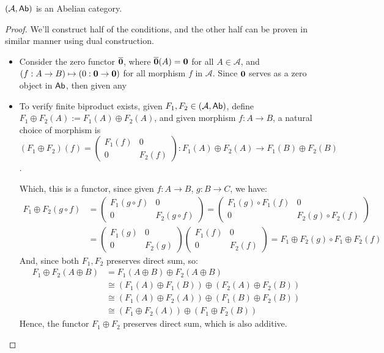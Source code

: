 \documentclass{article}
\begin{document}
\begin{thm}
    $(\mathcal{A},\mathsf{Ab})$ is an Abelian category.
\end{thm}
\begin{proof}

    We'll construct half of the conditions, and the other half can be proven in similar manner using dual construction.

    \begin{itemize}
        \item[A0:] Consider the zero functor $\overline{\mathbf{0}}$, where $\overline{\mathbf{0}}(A)=\mathbf{0}$ for all $A\in\mathcal{A}$, and $(f:A\rightarrow B)\mapsto (0:\mathbf{0}\rightarrow\mathbf{0})$ for all morphism $f$ in $\mathcal{A}$. Since $\mathbf{0}$ serves as a zero object in $\mathsf{Ab}$, then given any 
        
        \hfil

        \item[A1:] To verify finite biproduct exists, given $F_1,F_2\in(\mathcal{A},\mathsf{Ab})$, define $F_1\oplus F_2(A):= F_1(A)\oplus F_2(A)$, and given morphism $f:A\rightarrow B$, a natural choice of morphism is $(F_1\oplus F_2)(f) = \begin{pmatrix}
            F_1(f) & 0\\0& F_2 (f)
        \end{pmatrix}:F_1(A)\oplus F_2(A) \rightarrow F_1(B)\oplus F_2(B)$.

        Which, this is a functor, since given $f:A\rightarrow B$, $g:B\rightarrow C$, we have:
        \begin{align}
            F_1\oplus F_2(g\circ f) &= \begin{pmatrix}
                F_1(g\circ f)&0\\0&F_2(g\circ f)
            \end{pmatrix} = \begin{pmatrix}
                F_1(g)\circ F_1(f)&0\\0&F_2(g)\circ F_2(f)
            \end{pmatrix} \\
            &= \begin{pmatrix}
                F_1(g)&0\\0&F_2(g)
            \end{pmatrix}\begin{pmatrix}
                F_1(f)&0\\0&F_2(f)
            \end{pmatrix} = F_1\oplus F_2(g)\circ F_1\oplus F_2(f)
        \end{align}
        And, since both $F_1,F_2$ preserves direct sum, so:
        \begin{align}
            F_1\oplus F_2(A\oplus B)&= F_1(A\oplus B)\oplus F_2(A\oplus B)\\
            &\cong (F_1(A)\oplus F_1(B))\oplus (F_2(A)\oplus F_2(B))\\
            &\cong (F_1(A)\oplus F_2(A))\oplus (F_1(B)\oplus F_2(B))\\
            &\cong (F_1\oplus F_2(A))\oplus (F_1\oplus F_2(B))
        \end{align}
        Hence, the functor $F_1\oplus F_2$ preserves direct sum, which is also additive.


\end{itemize}
\end{proof}
\end{document}
